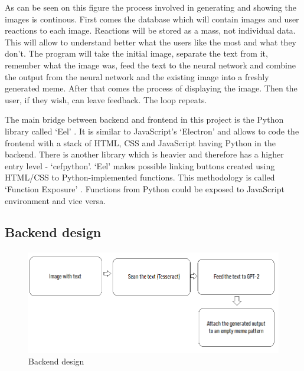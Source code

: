 \documentclass[12pt]{report}
\begin{document}
    As can be seen on this figure the process involved in generating and showing the images is continous. First comes the database which will contain images and user reactions to each image. Reactions will be stored as a mass, not individual data. This will allow to understand better what the users like the most and what they don't. 
    The program will take the initial image, separate the text from it, remember what the image was, feed the text to the neural network and combine the output from the neural network and the existing image into a freshly generated meme. After that comes the process of displaying the image. Then the user, if they wish, can leave feedback. The loop repeats.

    The main bridge between backend and frontend in this project is the Python library called `Eel' \citep{eel_github}. It is similar to JavaScript's `Electron' and allows to code the frontend with a stack of HTML, CSS and JavaScript having Python in the backend. There is another library which is heavier and therefore has a higher entry level - `cefpython'.
    `Eel' makes possible linking buttons created using HTML/CSS to Python-implemented functions. This methodology is called `Function Exposure' \citep{eel_github}. Functions from Python could be exposed to JavaScript environment and vice versa.

    \clearpage

    \subsection*{Backend design}
    \paragraph{}

    \begin{figure}[htbp]
        \centerline{\includegraphics[scale=.5]{img/backend_diagram.png}}
        \label{backend_diagram}
        \caption{Backend design}
    \end{figure}
\end{document}

